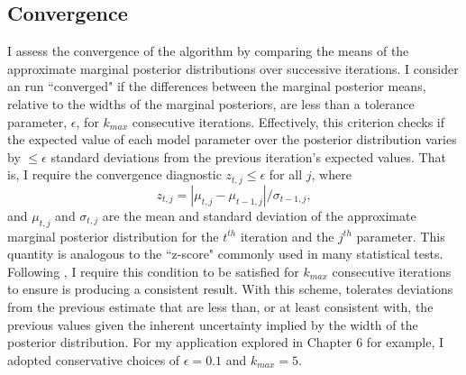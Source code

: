 \subsection{Convergence} \label{AP:sec:app:convergence}

I assess the convergence of the \approxposterior algorithm by comparing the means of the approximate marginal posterior distributions over successive iterations. I consider an \approxposterior run ``converged" if the differences between the marginal posterior means, relative to the widths of the marginal posteriors, are less than a tolerance parameter, $\epsilon$, for $k_{max}$ consecutive iterations. Effectively, this criterion checks if the expected value of each model parameter over the posterior distribution varies by ${\leq}{\epsilon}$ standard deviations from the previous iteration's expected values. That is, I require the \approxposterior convergence diagnostic $z_{t,j}{\leq}{\epsilon}$ for all $j$, where
\begin{equation}
    z_{t,j} = |\mu_{t,j} - \mu_{t-1,j}| / \sigma_{t-1,j},
\end{equation}
 and $\mu_{t,j}$ and $\sigma_{t,j}$ are the mean and standard deviation of the approximate marginal posterior distribution for the $t^{th}$ iteration and the $j^{th}$ parameter. This quantity is analogous to the ``z-score" commonly used in many statistical tests. Following \citet{Wang2018}, I require this condition to be satisfied for $k_{max}$ consecutive iterations to ensure \approxposterior is producing a consistent result. With this scheme, \approxposterior tolerates deviations from the previous estimate that are less than, or at least consistent with, the previous values given the inherent uncertainty implied by the width of the posterior distribution. For my application explored in Chapter 6 for example, I adopted conservative choices of $\epsilon = 0.1$ and $k_{max} = 5$. 
 
